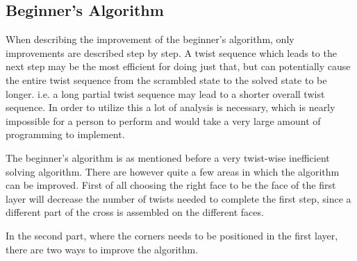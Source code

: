 

\subsection{Beginner's Algorithm}

When describing the improvement of the beginner's algorithm, only improvements are described step by step. 
A twist sequence which leads to the next step may be the most efficient for doing just that, but can potentially cause the entire twist sequence from the scrambled state to the solved state to be longer. 
i.e. a long partial twist sequence may lead to a shorter overall twist sequence. In order to utilize this a lot of analysis is necessary, which is nearly impossible for a person to perform and would take a very large amount of programming to implement.


The beginner's algorithm is as mentioned before a very twist-wise inefficient solving algorithm. 
There are however quite a few areas in which the algorithm can be improved.
First of all choosing the right face to be the face of the first layer will decrease the number of twists needed to complete the first step, since a different part of the cross is assembled on the different faces.

In the second part, where the corners needs to be positioned in the first layer, there are two ways to improve the algorithm.
